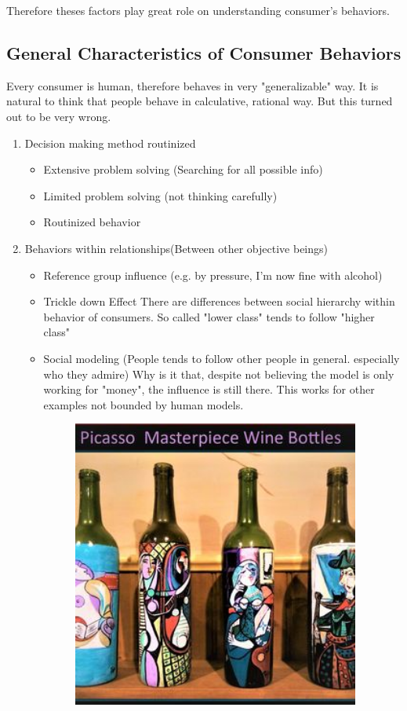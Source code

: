 \documentclass[12pt]{article}
\begin{document}
Therefore theses factors play great role on understanding consumer's behaviors.

\subsection{General Characteristics of Consumer Behaviors}

Every consumer is human, therefore behaves in very "generalizable" way. It is natural to think that people behave in calculative, rational way. But this turned out to be very wrong.

\begin{enumerate}
	\item Decision making method routinized
	\begin{itemize}
		\item Extensive problem solving (Searching for all possible info)
		\item Limited problem solving (not thinking carefully)
		\item Routinized behavior
	\end{itemize}
	\item Behaviors within relationships(Between other objective beings)
	\begin{itemize}
		\item Reference group influence (e.g. by pressure, I'm now fine with alcohol)
		\item Trickle down Effect
		There are differences between social hierarchy within behavior of consumers. So called "lower class" tends to follow "higher class"
		\item Social modeling (People tends to follow other people in general. especially who they admire)
		Why is it that, despite not believing the model is only working for "money", the influence is still there. This works for other examples not bounded by human models.
		\begin{figure}[H]
	\centering
	\includegraphics[width=0.95\textwidth]{img/picawine.png}

\end{figure}
\end{itemize}
\end{enumerate}
\end{document}
